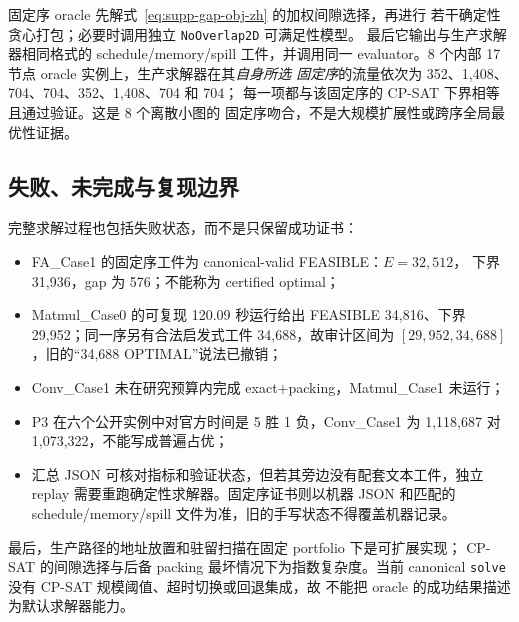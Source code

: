 固定序 oracle 先解式~\eqref{eq:supp-gap-obj-zh} 的加权间隙选择，再进行
若干确定性贪心打包；必要时调用独立 \texttt{NoOverlap2D} 可满足性模型。
最后它输出与生产求解器相同格式的 schedule/memory/spill 工件，并调用同一
evaluator。8 个内部 17 节点 oracle 实例上，生产求解器在其\emph{自身所选
固定序}的流量依次为 352、1,408、704、704、352、1,408、704 和 704；
每一项都与该固定序的 CP-SAT 下界相等且通过验证。这是 8 个离散小图的
固定序吻合，不是大规模扩展性或跨序全局最优性证据。

\subsection{失败、未完成与复现边界}

完整求解过程也包括失败状态，而不是只保留成功证书：
\begin{itemize}
  \item FA\_Case1 的固定序工件为 canonical-valid FEASIBLE：$E=32{,}512$，
        下界 31,936，gap 为 576；不能称为 certified optimal；
  \item Matmul\_Case0 的可复现 120.09 秒运行给出 FEASIBLE 34,816、下界
        29,952；同一序另有合法启发式工件 34,688，故审计区间为
        $[29{,}952,34{,}688]$，旧的“34,688 OPTIMAL”说法已撤销；
  \item Conv\_Case1 未在研究预算内完成 exact+packing，Matmul\_Case1 未运行；
  \item P3 在六个公开实例中对官方时间是 5 胜 1 负，Conv\_Case1 为
        1,118,687 对 1,073,322，不能写成普遍占优；
  \item 汇总 JSON 可核对指标和验证状态，但若其旁边没有配套文本工件，独立
        replay 需要重跑确定性求解器。固定序证书则以机器 JSON 和匹配的
        schedule/memory/spill 文件为准，旧的手写状态不得覆盖机器记录。
\end{itemize}

最后，生产路径的地址放置和驻留扫描在固定 portfolio 下是可扩展实现；
CP-SAT 的间隙选择与后备 packing 最坏情况下为指数复杂度。当前
canonical \texttt{solve} 没有 CP-SAT 规模阈值、超时切换或回退集成，故
不能把 oracle 的成功结果描述为默认求解器能力。
